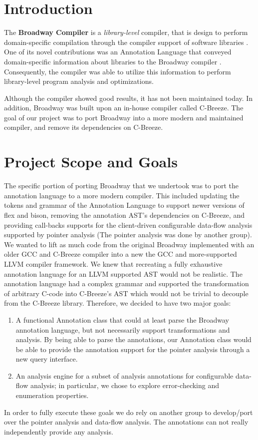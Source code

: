 \chapter{Introduction}
The {\bf Broadway Compiler} is a \textit{library-level} compiler, that is design to perform domain-specific compilation through the compiler support of software libraries \citep{bdwythesis}. 
One of its novel contributions was an Annotation Language that conveyed domain-specific information about libraries to the Broadway compiler \citep{Guyer1999}. Consequently, the compiler was able to utilize this information to perform library-level program analysis and optimizations. 

Although the compiler showed good results, it has not been maintained today. In addition, Broadway was built upon an in-house compiler called C-Breeze. The goal of our project was to port Broadway into a more modern and maintained compiler, and remove its dependencies on C-Breeze.

\chapter{Project Scope and Goals}
The specific portion of porting Broadway that we undertook was to port the annotation language to a more modern compiler. This included updating the tokens and grammar of the Annotation Language to support newer versions of flex and bison, removing the annotation AST's dependencies on C-Breeze, and providing call-backs supports for the client-driven configurable data-flow analysis supported by pointer analysis (The pointer analysis was done by another group).  We wanted to lift as much code from the original Broadway implemented with an older GCC and C-Breeze compiler into a new the GCC and more-supported LLVM compiler framework. We knew that recreating a fully exhaustive annotation language for an LLVM supported AST would not be realistic. The annotation language had a complex grammar and supported the transformation of arbitrary C-code into C-Breeze's AST which would not be trivial to decouple from the C-Breeze library. Therefore, we decided to have two major goals:

\begin{enumerate}
\item A functional Annotation class that could at least parse the Broadway annotation language, but not necessarily support transformations and analysis. By being able to parse the annotations, our Annotation class would be able to provide the annotation support for the pointer analysis through a new query interface. 
\item An analysis engine for a subset of analysis annotations for configurable data-flow analysis; in particular, we chose to explore error-checking and enumeration properties.
\end{enumerate}

In order to fully execute these goals we do rely on another group to develop/port over the pointer analysis and data-flow analysis.  The annotations can not really independently provide any analysis.